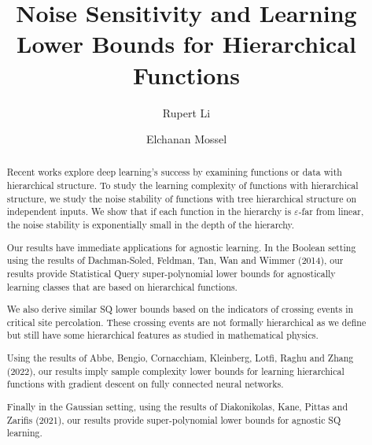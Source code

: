 \documentclass[12pt,letterpaper]{amsart}
\title[Noise Sensitivity and Learning Lower Bounds for Hierarchical Functions]{Noise Sensitivity and Learning Lower Bounds for Hierarchical Functions}
\newcommand{\1}[1]{1_{\left\{#1\right\}}}
\theoremstyle{definition}
\theoremstyle{remark}
\begin{document}
\author[Rupert Li]{Rupert Li}
\address[]{Stanford University, Stanford, CA 94305, USA}

\author[Elchanan Mossel]{Elchanan Mossel}
\address[]{Massachusetts Institute of Technology, Cambridge, MA 02139, USA}

\begin{abstract}
    Recent works explore deep learning's success by examining functions or data with hierarchical structure.
    To study the learning complexity of functions with hierarchical structure, 
    we study the noise stability of functions with tree hierarchical structure on independent inputs.
    We show that if each function in the hierarchy is $\varepsilon$-far from linear,
    the noise stability is exponentially small in the depth of the hierarchy. 

    Our results have immediate applications for agnostic learning.
    In the Boolean setting using the results of
    Dachman-Soled, Feldman, Tan, Wan and Wimmer (2014), our results provide Statistical Query super-polynomial lower bounds for agnostically learning classes that are based on hierarchical functions.
 
    We also derive similar SQ lower bounds based on the indicators of crossing events in critical site percolation. These crossing events are not formally hierarchical as we define but still have some hierarchical features as studied in  mathematical physics.

    Using the results of Abbe, Bengio, Cornacchiam, Kleinberg, Lotfi, Raghu and Zhang (2022), our results imply sample complexity lower bounds for learning hierarchical functions with gradient descent on fully connected neural networks. 
    
    Finally in the Gaussian setting, using the results of Diakonikolas, Kane, Pittas and Zarifis (2021), our results provide super-polynomial lower bounds for agnostic SQ learning.
    
\end{abstract}


\maketitle
\end{document}
